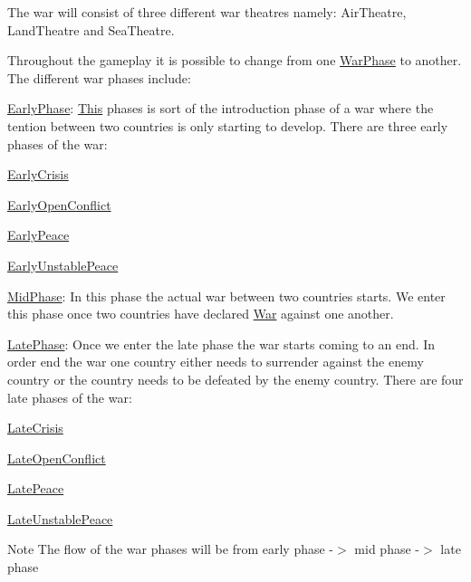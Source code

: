 \begin{DoxyItemize}
\item The war will consist of three different war theatres namely\+: Air\+Theatre, Land\+Theatre and Sea\+Theatre.
\item Throughout the gameplay it is possible to change from one \mbox{\hyperlink{class_war_phase}{War\+Phase}} to another. The different war phases include\+:
\begin{DoxyItemize}
\item \mbox{\hyperlink{class_early_phase}{Early\+Phase}}\+: \mbox{\hyperlink{class_this}{This}} phases is sort of the introduction phase of a war where the tention between two countries is only starting to develop. There are three early phases of the war\+:
\begin{DoxyItemize}
\item \mbox{\hyperlink{class_early_crisis}{Early\+Crisis}}
\item \mbox{\hyperlink{class_early_open_conflict}{Early\+Open\+Conflict}}
\item \mbox{\hyperlink{class_early_peace}{Early\+Peace}}
\item \mbox{\hyperlink{class_early_unstable_peace}{Early\+Unstable\+Peace}}
\end{DoxyItemize}
\item \mbox{\hyperlink{class_mid_phase}{Mid\+Phase}}\+: In this phase the actual war between two countries starts. We enter this phase once two countries have declared \mbox{\hyperlink{class_war}{War}} against one another.
\item \mbox{\hyperlink{class_late_phase}{Late\+Phase}}\+: Once we enter the late phase the war starts coming to an end. In order end the war one country either needs to surrender against the enemy country or the country needs to be defeated by the enemy country. There are four late phases of the war\+:
\begin{DoxyItemize}
\item \mbox{\hyperlink{class_late_crisis}{Late\+Crisis}}
\item \mbox{\hyperlink{class_late_open_conflict}{Late\+Open\+Conflict}}
\item \mbox{\hyperlink{class_late_peace}{Late\+Peace}}
\item \mbox{\hyperlink{class_late_unstable_peace}{Late\+Unstable\+Peace}} \begin{DoxyNote}{Note}
The flow of the war phases will be from early phase -\/$>$ mid phase -\/$>$ late phase 
\end{DoxyNote}

\end{DoxyItemize}
\end{DoxyItemize}
\end{DoxyItemize}

